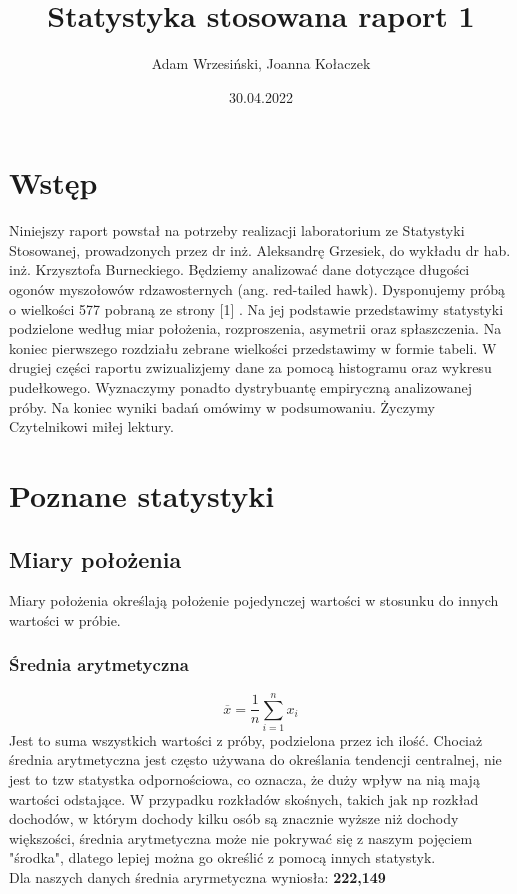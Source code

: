 \documentclass{article}
\title{Statystyka stosowana raport 1}
\author{Adam Wrzesiński, Joanna Kołaczek}
\date{30.04.2022}
\theoremstyle{break}
\begin{document}
	\maketitle
	\tableofcontents
	\clearpage
\section{Wstęp}

Niniejszy raport powstał na potrzeby realizacji laboratorium ze Statystyki Stosowanej, prowadzonych przez dr inż. Aleksandrę Grzesiek, do wykładu dr hab. inż. Krzysztofa Burneckiego. Będziemy analizować dane dotyczące długości ogonów myszołowów rdzawosternych (ang. red-tailed hawk). Dysponujemy próbą o wielkości 577 pobraną ze strony [1] . Na jej podstawie przedstawimy statystyki podzielone według miar położenia, rozproszenia, asymetrii oraz spłaszczenia. Na koniec pierwszego rozdziału zebrane wielkości przedstawimy w formie tabeli.  W drugiej części raportu zwizualizjemy dane za pomocą histogramu oraz wykresu pudełkowego. Wyznaczymy ponadto dystrybuantę empiryczną analizowanej próby. Na koniec wyniki badań omówimy w podsumowaniu. Życzymy Czytelnikowi miłej lektury.

\section{Poznane statystyki}
\subsection{Miary położenia}

Miary położenia określają położenie pojedynczej wartości w stosunku do innych wartości w próbie. 

\subsubsection{Średnia arytmetyczna}
$$\overline{x}=\frac{1}{n}\sum\limits_{i=1}^{n}x_i$$
Jest to suma wszystkich wartości z próby, podzielona przez ich ilość. Chociaż średnia arytmetyczna jest często używana do określania tendencji centralnej, nie jest to tzw statystka odpornościowa, co oznacza, że duży wpływ na nią mają wartości odstające. W przypadku rozkładów skośnych, takich jak np rozkład dochodów, w którym dochody kilku osób są znacznie wyższe niż dochody większości, średnia arytmetyczna może nie pokrywać się z naszym pojęciem "środka", dlatego lepiej można go określić z pomocą innych statystyk.\\
Dla naszych danych średnia aryrmetyczna wyniosła: \textbf{222,149}
\end{document}
